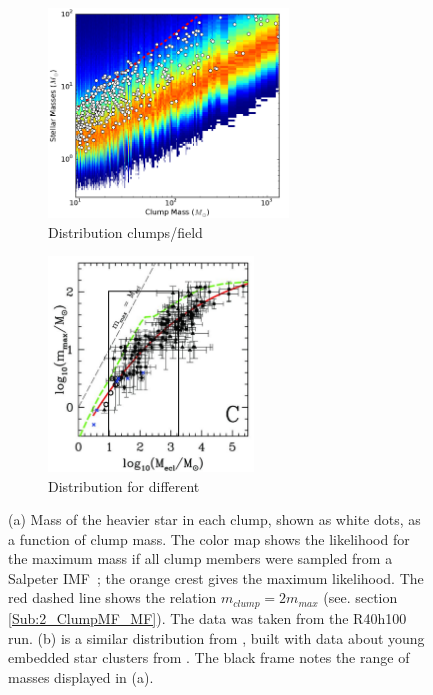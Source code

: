  \begin{figure}
\center
    \centering
    \begin{subfigure}[b]{\textwidth}
    	\centering
    	\includegraphics[width=0.7\textwidth]{Figures/2_MaxMass}
        \caption{Distribution clumps/field}
        \label{Fig:2_MaxMass}
    \end{subfigure}
    \begin{subfigure}[b]{\textwidth}
    	\centering
    	\includegraphics[width=0.6\textwidth]{Figures/2_weidner}
        \caption{Distribution for different \tHub}
        \label{Fig:2_weidner}
    \end{subfigure}
\caption{(a) Mass of the heavier star in each clump, shown as white dots, as a function of clump mass. The color map shows the likelihood for the maximum mass if all clump members were  sampled from a Salpeter IMF~; the orange crest gives the maximum likelihood. The red dashed line shows the  relation $m_{clump} = 2 m_{max}$ (see. section \ref{Sub:2_ClumpMF_MF}). The data was taken from the R40h100 run. (b) is a similar distribution from \protect\cite{Weidner2013}, built with data about young embedded star clusters from \cite{Weidner2010}. The black frame notes the range of masses displayed in (a). } 
\label{Fig:2_McMmax}
\end{figure}


